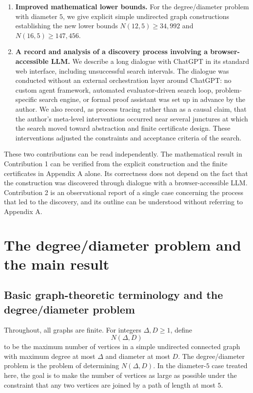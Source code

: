 \documentclass[11pt]{article}
\theoremstyle{definition}
\theoremstyle{remark}
\renewcommand{\_}{\textunderscore\allowbreak}
\begin{document}
\begin{enumerate}
\def\labelenumi{\arabic{enumi}.}
\item
  \textbf{Improved mathematical lower bounds.} For the degree/diameter
  problem with diameter \(5\), we give explicit simple undirected graph
  constructions establishing the new lower bounds \(N(12,5)\ge34{,}992\)
  and \(N(16,5)\ge147{,}456\).
\item
  \textbf{A record and analysis of a discovery process involving a
  browser-accessible LLM.} We describe a long dialogue with ChatGPT in
  its standard web interface, including unsuccessful search intervals.
  The dialogue was conducted without an external orchestration layer around
  ChatGPT: no custom agent framework, automated evaluator-driven search
  loop, problem-specific search engine, or formal proof assistant was set
  up in advance by the author. We also
  record, as process tracing rather than as a causal claim, that the
  author's meta-level interventions occurred near
  several junctures at which the search moved toward abstraction and
  finite certificate design. These interventions adjusted the
  constraints and acceptance criteria of the search.
\end{enumerate}

These two contributions can be read independently. The mathematical
result in Contribution 1 can be verified from the explicit construction
and the finite certificates in Appendix A alone. Its correctness does
not depend on the fact that the construction was discovered through
dialogue with a browser-accessible LLM. Contribution 2 is an
observational report of a single case concerning the process that led to
the discovery, and its outline can be understood without referring to
Appendix A.


\section{The degree/diameter problem and the main
result}\label{the-degreediameter-problem-and-the-main-result}

\subsection{Basic graph-theoretic terminology and the
degree/diameter
problem}\label{basic-graph-theoretic-terminology-and-the-degreediameter-problem}

Throughout, all graphs are finite. For integers \(\Delta,D\ge1\), define \[N(\Delta,D)\] to be the maximum number of vertices in a simple undirected connected
graph with maximum degree at most \(\Delta\) and diameter at most \(D\).
The degree/diameter problem is the problem of determining
\(N(\Delta,D)\). In the diameter-\(5\) case treated here, the goal is to
make the number of vertices as large as possible under the constraint
that any two vertices are joined by a path of length at most \(5\). 
\end{document}
